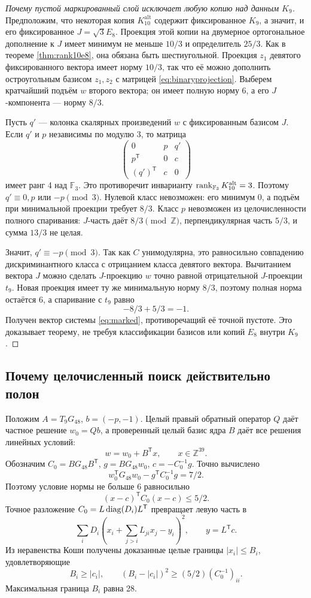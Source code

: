 \documentclass[11pt,a4paper]{article}
\theoremstyle{remark}\newtheorem{remark}[theorem]{Замечание}
\newcommand{\Z}{\mathbb Z}\newcommand{\R}{\mathbb R}\newcommand{\F}{\mathbb F}
\newcommand{\Kalt}{K_{10}^{\mathrm{alt}}}
\begin{document}
\begin{proof}[Почему пустой маркированный слой исключает любую копию над данным $K_9$]
Предположим, что некоторая копия $\Kalt$ содержит фиксированное $K_9$, а значит, и его фиксированное $J=\sqrt3E_8$. Проекция этой копии на двумерное ортогональное дополнение к $J$ имеет минимум не меньше $10/3$ и определитель $25/3$. Как в теореме \ref{thm:rank10e8}, она обязана быть шестиугольной. Проекция $z_1$ девятого фиксированного вектора имеет норму $10/3$, так что её можно дополнить остроугольным базисом $z_1,z_2$ с матрицей \eqref{eq:binaryprojection}. Выберем кратчайший подъём $w$ второго вектора; он имеет полную норму 6, а его $J$-компонента --- норму $8/3$.

Пусть $q'$ --- колонка скалярных произведений $w$ с фиксированным базисом $J$. Если $q'$ и $p$ независимы по модулю 3, то матрица
\[
\begin{pmatrix}0&p&q'\\p^{\mathsf T}&0&c\\(q')^{\mathsf T}&c&0\end{pmatrix}
\]
имеет ранг 4 над $\F_3$. Это противоречит инварианту $\rank_{\F_3}\Kalt=3$. Поэтому $q'\equiv0,p$ или $-p\pmod3$. Нулевой класс невозможен: его минимум 0, а подъём при минимальной проекции требует $8/3$. Класс $p$ невозможен из целочисленности полного спаривания: $J$-часть даёт $8/3\pmod\Z$, перпендикулярная часть $5/3$, и сумма $13/3$ не целая.

Значит, $q'\equiv-p\pmod3$. Так как $C$ унимодулярна, это равносильно совпадению дискриминантного класса с отрицанием класса девятого вектора. Вычитанием вектора $J$ можно сделать $J$-проекцию $w$ точно равной отрицательной $J$-проекции $t_9$. Новая проекция имеет ту же минимальную норму $8/3$, поэтому полная норма остаётся 6, а спаривание с $t_9$ равно
\[
-8/3+5/3=-1.
\]
Получен вектор системы \eqref{eq:marked}, противоречащий её точной пустоте. Это доказывает теорему, не требуя классификации базисов или копий $E_8$ внутри $K_9$.
\end{proof}

\subsection{Почему целочисленный поиск действительно полон}

Положим $A=T_9G_{48}$, $b=(-p,-1)$. Целый правый обратный оператор $Q$ даёт частное решение $w_0=Qb$, а проверенный целый базис ядра $B$ даёт все решения линейных условий:
\[
w=w_0+B^{\mathsf T}x,\qquad x\in\Z^{39}.
\]
Обозначим $C_0=BG_{48}B^{\mathsf T}$, $g=BG_{48}w_0$, $c=-C_0^{-1}g$. Точно вычислено
\[
w_0^{\mathsf T}G_{48}w_0-g^{\mathsf T}C_0^{-1}g=7/2.
\]
Поэтому условие нормы не больше 6 равносильно
\[
(x-c)^{\mathsf T}C_0(x-c)\le5/2.
\]
Точное разложение $C_0=L\operatorname{diag}(D_i)L^{\mathsf T}$ превращает левую часть в
\[
\sum_iD_i\left(x_i+\sum_{j>i}L_{ji}x_j-y_i\right)^2,\qquad y=L^{\mathsf T}c.
\]
Из неравенства Коши получены доказанные целые границы $|x_i|\le B_i$, удовлетворяющие
\[
B_i\ge|c_i|,\qquad (B_i-|c_i|)^2\ge(5/2)(C_0^{-1})_{ii}.
\]
Максимальная граница $B_i$ равна 28.
\end{document}
